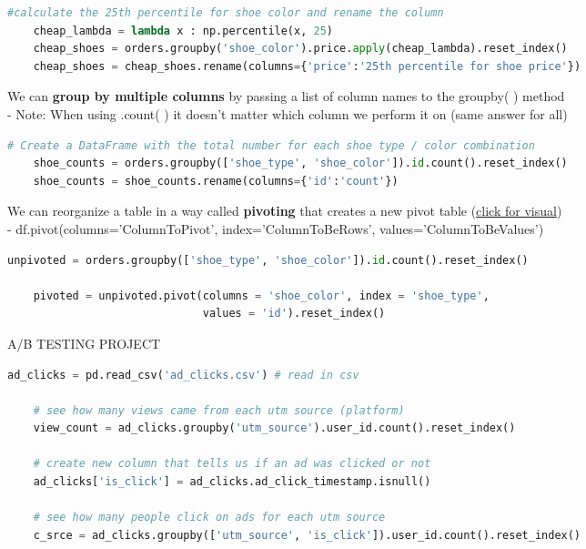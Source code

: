 \documentclass[11pt, a4paper]{article}
\begin{document}
\begin{spacing}{1.1}
\begin{lstlisting}[language=Python]
	#calculate the 25th percentile for shoe color and rename the column
	cheap_lambda = lambda x : np.percentile(x, 25) 
	cheap_shoes = orders.groupby('shoe_color').price.apply(cheap_lambda).reset_index() 
	cheap_shoes = cheap_shoes.rename(columns={'price':'25th percentile for shoe price'}) \end{lstlisting}\vspace*{1mm}
	We can \textbf{group by multiple columns} by passing a list of column names to the groupby( ) method \\
	\hspace*{4mm} - Note: When using .count( ) it doesn't matter which column we perform it on (same answer for all)
	\begin{lstlisting}[language=Python]
	# Create a DataFrame with the total number for each shoe type / color combination
	shoe_counts = orders.groupby(['shoe_type', 'shoe_color']).id.count().reset_index()
	shoe_counts = shoe_counts.rename(columns={'id':'count'}) \end{lstlisting}\vspace*{1mm}
	We can reorganize a table in a way called \textbf{pivoting} that creates a new pivot table (\href{https://pandas.pydata.org/pandas-docs/version/0.24.2/user_guide/reshaping.html}{click for visual})\\
	\hspace*{4mm} - df.pivot(columns='ColumnToPivot', index='ColumnToBeRows', values='ColumnToBeValues')
	\begin{lstlisting}[language=Python]
	unpivoted = orders.groupby(['shoe_type', 'shoe_color']).id.count().reset_index()
	
	pivoted = unpivoted.pivot(columns = 'shoe_color', index = 'shoe_type', 
	                          values = 'id').reset_index() \end{lstlisting} \newpage
	\noindent A/B TESTING PROJECT
	\begin{lstlisting}[language=Python]	
	ad_clicks = pd.read_csv('ad_clicks.csv') # read in csv
	
	# see how many views came from each utm source (platform)
	view_count = ad_clicks.groupby('utm_source').user_id.count().reset_index()
	
	# create new column that tells us if an ad was clicked or not
	ad_clicks['is_click'] = ad_clicks.ad_click_timestamp.isnull()
	
	# see how many people click on ads for each utm source
	c_srce = ad_clicks.groupby(['utm_source', 'is_click']).user_id.count().reset_index()
	

\end{lstlisting}
\end{spacing}
\end{document}
